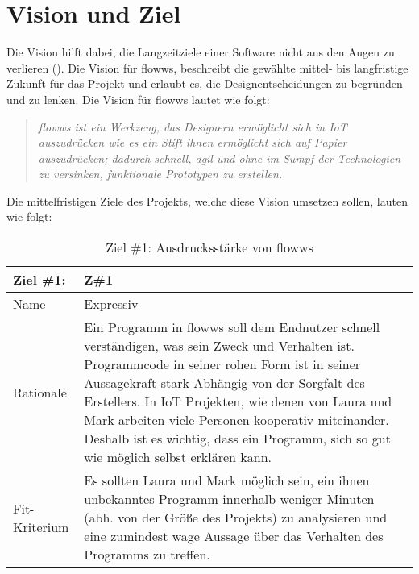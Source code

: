 \section{Vision und Ziel}
Die Vision hilft dabei, die Langzeitziele einer Software nicht aus den Augen zu verlieren (\cite{wiegers2013software}). Die Vision für flowws, beschreibt die gewählte mittel- bis langfristige Zukunft für das Projekt und erlaubt es, die Designentscheidungen zu begründen und zu lenken. Die Vision für flowws lautet wie folgt:
\begin{quote}
    \textit{flowws ist ein Werkzeug, das Designern ermöglicht sich in \ac{IoT} auszudrücken wie es ein Stift ihnen ermöglicht sich auf Papier auszudrücken; dadurch schnell, agil und ohne im Sumpf der Technologien zu versinken, funktionale Prototypen zu erstellen.}
\end{quote}

Die mittelfristigen Ziele des Projekts, welche diese Vision umsetzen sollen, lauten wie folgt: 

\begin{table}[H]
\caption{Ziel \#1: Ausdrucksstärke von flowws}
\label{tab:ziel3}
\begin{tabularx}{\textwidth}{lX}
\hline
\rowcolor[HTML]{EFEFEF} 
Ziel \#1:     & Z\#1 \\ \hline
Name          & Expressiv \\ \hline
Rationale     & Ein Programm in flowws soll dem Endnutzer schnell verständigen, was sein Zweck und Verhalten ist. Programmcode in seiner rohen Form ist in seiner Aussagekraft stark Abhängig von der Sorgfalt des Erstellers. In IoT Projekten, wie denen von Laura und Mark arbeiten viele Personen kooperativ miteinander. Deshalb ist es wichtig, dass ein Programm, sich so gut wie möglich selbst erklären kann. \\ \hline
Fit-Kriterium & Es sollten Laura und Mark möglich sein, ein ihnen unbekanntes Programm innerhalb weniger Minuten (abh. von der Größe des Projekts) zu analysieren und eine zumindest wage Aussage über das Verhalten des Programms zu treffen. \\ \hline
\end{tabularx}
\end{table}

